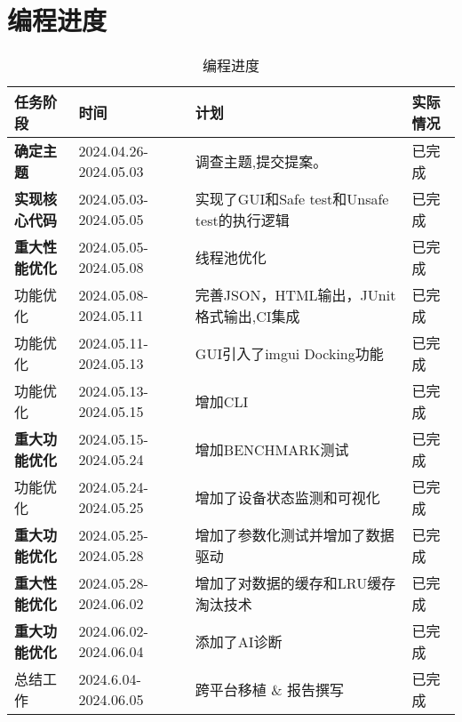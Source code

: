 \documentclass{article}
\begin{document}
\section{编程进度}
\begin{table}[H]
    \centering
    \begin{tabular}{|l|l|l|l|}
        \toprule
        \textbf{任务阶段}   & \textbf{时间}           & \textbf{计划}                       & \textbf{实际情况} \\ \midrule
        \textbf{确定主题}   & 2024.04.26-2024.05.03 & 调查主题,提交提案。                        & 已完成           \\ \midrule
        \textbf{实现核心代码} & 2024.05.03-2024.05.05 & 实现了GUI和Safe test和Unsafe test的执行逻辑 & 已完成           \\ \midrule
        \textbf{重大性能优化} & 2024.05.05-2024.05.08 & 线程池优化                             & 已完成           \\ \midrule
        功能优化            & 2024.05.08-2024.05.11 & 完善JSON，HTML输出，JUnit格式输出,CI集成      & 已完成           \\ \midrule
        功能优化            & 2024.05.11-2024.05.13 & GUI引入了imgui Docking功能             & 已完成           \\ \midrule
        功能优化            & 2024.05.13-2024.05.15 & 增加CLI                             & 已完成           \\ \midrule
        \textbf{重大功能优化} & 2024.05.15-2024.05.24 & 增加BENCHMARK测试                     & 已完成           \\ \midrule
        功能优化            & 2024.05.24-2024.05.25 & 增加了设备状态监测和可视化                     & 已完成           \\ \midrule
        \textbf{重大功能优化} & 2024.05.25-2024.05.28 & 增加了参数化测试并增加了数据驱动                  & 已完成           \\ \midrule
        \textbf{重大性能优化} & 2024.05.28-2024.06.02 & 增加了对数据的缓存和LRU缓存淘汰技术               & 已完成           \\ \midrule
        \textbf{重大功能优化} & 2024.06.02-2024.06.04 & 添加了AI诊断                           & 已完成           \\ \midrule
        总结工作            & 2024.6.04-2024.06.05  & 跨平台移植 \& 报告撰写                     & 已完成           \\
        \bottomrule
    \end{tabular}
    \caption{编程进度}
\end{table}
\end{document}
